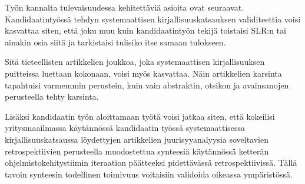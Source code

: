 Työn kannalta tulevaisuudessa kehitettäviä asioita ovat seuraavat. Kandidaatintyössä tehdyn systemaattisen kirjallisuuskatsauksen validiteettia voisi kasvattaa siten, että joku muu kuin kandidaatintyön tekijä toistaisi SLR:n tai ainakin osia siitä ja tarkistaisi tulisiko itse samaan tulokseen.

Sitä tieteellisten artikkelien joukkoa, joka systemaattisen kirjallisuuksen puitteissa luettaan kokonaan, voisi myös kasvattaa. Näin artikkelien karsinta tapahtuisi varmemmin perustein, kuin vain abstraktin, otsikon ja avainsanojen perusteella tehty karsinta.

Lisäksi kandidaatin työn aloittamaan työtä voisi jatkaa siten, että kokeilisi yritysmaailmassa käytännössä kandidaatin työssä systemaattisessa kirjallisuuskatsaussa löydettyjen artikkelien juurisyyanalyysia soveltavien retrospektiivien perusteella muodostettua synteesiä käytännössä ketterän ohjelmistokehitystiimin iteraation päätteeksi pidettävässä retrospektiivissä. Tällä tavoin synteesin todellinen toimivuus voitaisiin validoida oikeassa ympäristössä.